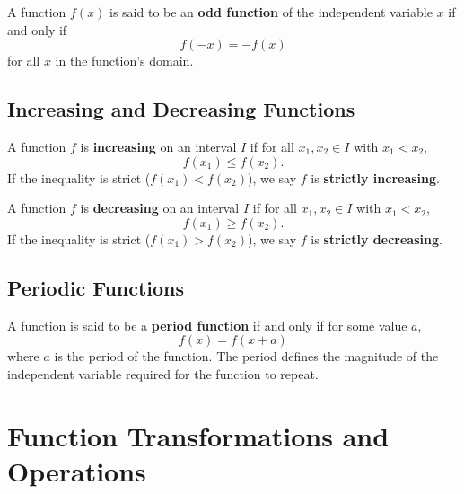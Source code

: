         \begin{definition}
            A function $f(x)$ is said to be an \textbf{odd function} of the independent variable $x$ if and only if
            $$
            f(-x) = -f(x)
            $$
            for all $x$ in the function's domain.
        \end{definition}

        \subsection{Increasing and Decreasing Functions}
        \begin{definition}
            A function $f$ is \textbf{increasing} on an interval $I$ if for all $x_1, x_2 \in I$ with $x_1 < x_2$,
            $$
            f(x_1) \leq f(x_2).
            $$
            If the inequality is strict ($f(x_1) < f(x_2)$), we say $f$ is \textbf{strictly increasing}.
        \end{definition}

        \begin{definition}
            A function $f$ is \textbf{decreasing} on an interval $I$ if for all $x_1, x_2 \in I$ with $x_1 < x_2$,
            $$
            f(x_1) \geq f(x_2).
            $$
            If the inequality is strict ($f(x_1) > f(x_2)$), we say $f$ is \textbf{strictly decreasing}.
        \end{definition}

        \subsection{Periodic Functions}
        \label{sect:periodic functions}
        \begin{definition}
            A function is said to be a \textbf{period function} if and only if for some value $a$,
            $$
            f(x) = f(x+a)
            $$
            where $a$ is the period of the function. The period defines the magnitude of the independent variable required for the function to repeat.
        \end{definition}

        \section{Function Transformations and Operations}
        \label{sect:function transformations and operations}
